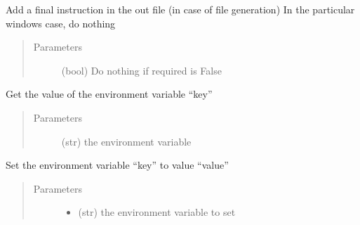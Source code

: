 \documentclass[a4paper,10pt,english]{sphinxmanual}
\begin{document}
\begin{fulllineitems}
\begin{fulllineitems}
\begin{quote}
\begin{description}
\begin{itemize}
\end{itemize}

\end{description}\end{quote}

\end{fulllineitems}


\begin{fulllineitems}
\label{\detokenize{apidoc_src/src:src.fileEnviron.BatFileEnviron.finish}}
Add a final instruction in the out file (in case of file generation)
In the particular windows case, do nothing
\begin{quote}\begin{description}
\item[{Parameters}] \leavevmode
{} \textendash{} (bool) Do nothing if required is False

\end{description}\end{quote}

\end{fulllineitems}


\begin{fulllineitems}
\label{\detokenize{apidoc_src/src:src.fileEnviron.BatFileEnviron.get}}
Get the value of the environment variable “key”
\begin{quote}\begin{description}
\item[{Parameters}] \leavevmode
{} \textendash{} (str) the environment variable

\end{description}\end{quote}

\end{fulllineitems}


\begin{fulllineitems}
\label{\detokenize{apidoc_src/src:src.fileEnviron.BatFileEnviron.set}}
Set the environment variable “key” to value “value”
\begin{quote}\begin{description}
\item[{Parameters}] \leavevmode\begin{itemize}
\item {} 
 \textendash{} (str) the environment variable to set


\end{itemize}
\end{description}
\end{quote}
\end{fulllineitems}
\end{fulllineitems}
\end{document}
